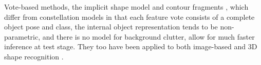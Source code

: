 Vote-based methods, \eg the implicit shape model \cite{Leibe2008} and contour fragments \cite{Shotton2008a}, which differ from constellation models in that each feature vote consists of a complete object pose and class, the internal object representation tends to be non-parametric, and there is no model for background clutter, allow for much faster inference at test stage. They too have been applied to both image-based \cite{Leibe2008, Shotton2008} and 3D shape recognition \cite{Flitton2010,  Knopp2010, Pham2011, Barinova2010}.

